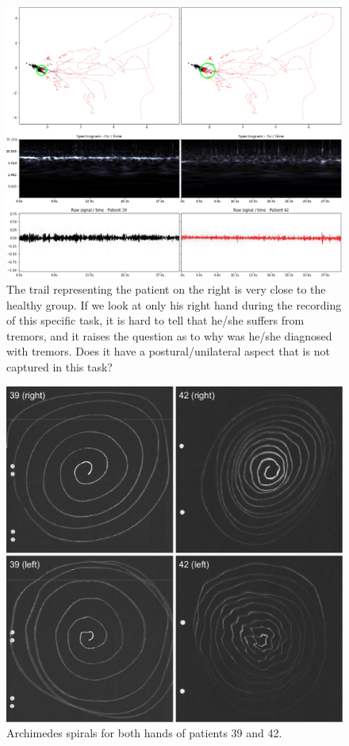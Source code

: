 \begin{figure}[ht]
\centering
\includegraphics[width=\linewidth]{figures/nemo/exp1-3942.png}
\caption{The trail representing the patient on the right is very close to the healthy group. If we look at only his right hand during the recording of this specific task, it is hard to tell that he/she suffers from tremors, and it raises the question as to why was he/she diagnosed with tremors. Does it have a postural/unilateral aspect that is not captured in this task?
}
\label{fig:exp1-3942}
\end{figure}

\begin{figure}[ht]
\centering
\includegraphics[width=.7\linewidth]{figures/nemo/4-spirals.pdf}
\caption{Archimedes spirals for both hands of patients 39 and 42.}
\label{fig:spirals}
\end{figure}
    
